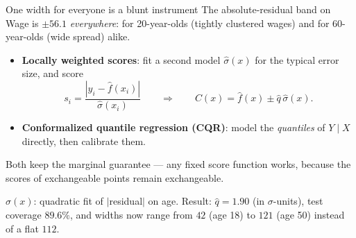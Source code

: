\documentclass[aspectratio=169,11pt]{beamer}
\begin{document}
\begin{frame}{One width for everyone is a blunt instrument}
  \footnotesize
  The absolute-residual band on Wage is $\pm 56.1$ \emph{everywhere}: for 20-year-olds
  (tightly clustered wages) and for 60-year-olds (wide spread) alike.
  \begin{readme}
    \begin{itemize}
      \item \textbf{Locally weighted scores}: fit a second model
            $\hat\sigma(x)$ for the typical error size, and score
            \[
              s_i = \frac{|y_i - \hat f(x_i)|}{\hat\sigma(x_i)}
              \qquad\Longrightarrow\qquad
              C(x) = \hat f(x) \pm \hat q\, \hat\sigma(x).
            \]
      \item \textbf{Conformalized quantile regression (CQR)}: model the
            \emph{quantiles} of $Y \mid X$ directly, then calibrate them.
    \end{itemize}
    Both keep the marginal guarantee --- any fixed score function works, because the
    scores of exchangeable points remain exchangeable.
  \end{readme}
  \begin{numexample}
    $\hat\sigma(x)$: quadratic fit of $|$residual$|$ on age. Result:
    $\hat q = 1.90$ (in $\sigma$-units), test coverage $89.6\%$, and widths now range
    from $42$ (age 18) to $121$ (age 50) instead of a flat $112$.
  \end{numexample}
\end{frame}
\end{document}
